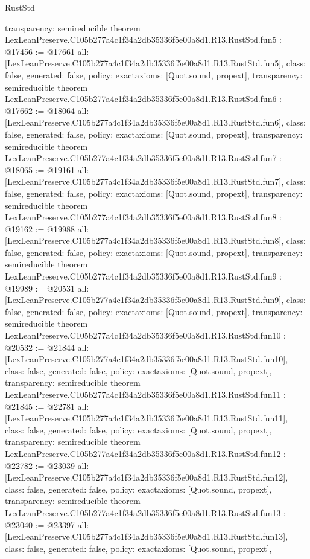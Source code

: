 \begin{lexlean}{RustStd}
\begin{coremodule}
{  transparency: semireducible
}
theorem LexLeanPreserve.C105b277a4c1f34a2db35336f5e00a8d1.R13.RustStd.fun5 : @17456 := @17661 {
  all: [LexLeanPreserve.C105b277a4c1f34a2db35336f5e00a8d1.R13.RustStd.fun5],
  class: false,
  generated: false,
  policy: exact{axioms: [Quot.sound, propext]},
  transparency: semireducible
}
theorem LexLeanPreserve.C105b277a4c1f34a2db35336f5e00a8d1.R13.RustStd.fun6 : @17662 := @18064 {
  all: [LexLeanPreserve.C105b277a4c1f34a2db35336f5e00a8d1.R13.RustStd.fun6],
  class: false,
  generated: false,
  policy: exact{axioms: [Quot.sound, propext]},
  transparency: semireducible
}
theorem LexLeanPreserve.C105b277a4c1f34a2db35336f5e00a8d1.R13.RustStd.fun7 : @18065 := @19161 {
  all: [LexLeanPreserve.C105b277a4c1f34a2db35336f5e00a8d1.R13.RustStd.fun7],
  class: false,
  generated: false,
  policy: exact{axioms: [Quot.sound, propext]},
  transparency: semireducible
}
theorem LexLeanPreserve.C105b277a4c1f34a2db35336f5e00a8d1.R13.RustStd.fun8 : @19162 := @19988 {
  all: [LexLeanPreserve.C105b277a4c1f34a2db35336f5e00a8d1.R13.RustStd.fun8],
  class: false,
  generated: false,
  policy: exact{axioms: [Quot.sound, propext]},
  transparency: semireducible
}
theorem LexLeanPreserve.C105b277a4c1f34a2db35336f5e00a8d1.R13.RustStd.fun9 : @19989 := @20531 {
  all: [LexLeanPreserve.C105b277a4c1f34a2db35336f5e00a8d1.R13.RustStd.fun9],
  class: false,
  generated: false,
  policy: exact{axioms: [Quot.sound, propext]},
  transparency: semireducible
}
theorem LexLeanPreserve.C105b277a4c1f34a2db35336f5e00a8d1.R13.RustStd.fun10 : @20532 := @21844 {
  all: [LexLeanPreserve.C105b277a4c1f34a2db35336f5e00a8d1.R13.RustStd.fun10],
  class: false,
  generated: false,
  policy: exact{axioms: [Quot.sound, propext]},
  transparency: semireducible
}
theorem LexLeanPreserve.C105b277a4c1f34a2db35336f5e00a8d1.R13.RustStd.fun11 : @21845 := @22781 {
  all: [LexLeanPreserve.C105b277a4c1f34a2db35336f5e00a8d1.R13.RustStd.fun11],
  class: false,
  generated: false,
  policy: exact{axioms: [Quot.sound, propext]},
  transparency: semireducible
}
theorem LexLeanPreserve.C105b277a4c1f34a2db35336f5e00a8d1.R13.RustStd.fun12 : @22782 := @23039 {
  all: [LexLeanPreserve.C105b277a4c1f34a2db35336f5e00a8d1.R13.RustStd.fun12],
  class: false,
  generated: false,
  policy: exact{axioms: [Quot.sound, propext]},
  transparency: semireducible
}
theorem LexLeanPreserve.C105b277a4c1f34a2db35336f5e00a8d1.R13.RustStd.fun13 : @23040 := @23397 {
  all: [LexLeanPreserve.C105b277a4c1f34a2db35336f5e00a8d1.R13.RustStd.fun13],
  class: false,
  generated: false,
  policy: exact{axioms: [Quot.sound, propext]},
}
\end{coremodule}
\end{lexlean}
